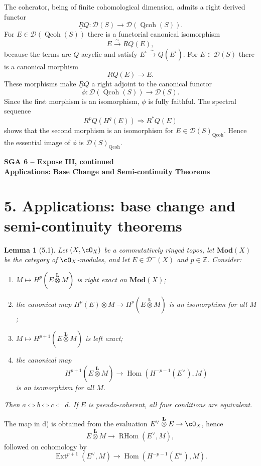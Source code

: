 \documentclass[11pt]{article}
\theoremstyle{plain}
\newtheorem*{lemma*}{Lemma}
\theoremstyle{definition}
\theoremstyle{remark}
\newcommand{\ZZ}{\mathbb Z}
\newcommand{\D}{\mathcal D}\newcommand{\E}{\mathcal E}\newcommand{\F}{\mathcal F}
\DeclareMathOperator{\Hom}{Hom}
\DeclareMathOperator{\Ext}{Ext}
\DeclareMathOperator{\RHom}{RHom}
\newcommand{\Mod}{\mathbf{Mod}}
\providecommand{\iso}{\xrightarrow{\sim}}
\providecommand{\Qcoh}{\operatorname{Qcoh}}
\providecommand{\Ltens}{\overset{\mathbf L}{\otimes}}
\begin{document}
The coherator, being of finite cohomological dimension, admits a right derived functor
\[
\underline RQ:\D(S)\longrightarrow\D(\Qcoh(S)).
\]
For $E\in\D(\Qcoh(S))$ there is a functorial canonical isomorphism
\[
E\iso \underline RQ(E),
\]
because the terms are $Q$-acyclic and satisfy $E^i\iso Q(E^i)$. For $E\in\D(S)$ there is a canonical morphism
\[
\underline RQ(E)\longrightarrow E.
\]
These morphisms make $\underline RQ$ a right adjoint to the canonical functor
\[
\phi:\D(\Qcoh(S))\longrightarrow\D(S).
\]
Since the first morphism is an isomorphism, $\phi$ is fully faithful. The spectral sequence
\[
R^pQ(H^q(E))\Rightarrow R^*Q(E)
\]
shows that the second morphism is an isomorphism for $E\in\D(S)_{\Qcoh}$. Hence the essential image of $\phi$ is $\D(S)_{\Qcoh}$.

\newpage
\begin{center}
{\Large\textbf{SGA 6 -- Expose III, continued}}\\[0.35em]
{\large\textbf{Applications: Base Change and Semi-continuity Theorems}}
\end{center}

\section*{5. Applications: base change and semi-continuity theorems}

\begin{lemma*}[5.1]
Let $(X,\cO_X)$ be a commutatively ringed topos, let $\Mod(X)$ be the category of $\cO_X$-modules, and let $E\in\D^-(X)$ and $p\in\ZZ$. Consider:
\begin{enumerate}[label=\alph*)]
\item $M\mapsto H^p(E\Ltens M)$ is right exact on $\Mod(X)$;
\item the canonical map $H^p(E)\otimes M\to H^p(E\Ltens M)$ is an isomorphism for all $M$;
\item $M\mapsto H^{p+1}(E\Ltens M)$ is left exact;
\item the canonical map
\[
H^{p+1}(E\Ltens M)\to \Hom(H^{-p-1}(E^\vee),M)
\]
is an isomorphism for all $M$.
\end{enumerate}
Then $a\Leftrightarrow b\Leftrightarrow c\Leftarrow d$. If $E$ is pseudo-coherent, all four conditions are equivalent.
\end{lemma*}

The map in d) is obtained from the evaluation $E^\vee\Ltens E\to\cO_X$, hence
\[
E\Ltens M\to\RHom(E^\vee,M),
\]
followed on cohomology by
\[
\Ext^{p+1}(E^\vee,M)\to\Hom(H^{-p-1}(E^\vee),M).
\]
\end{document}
